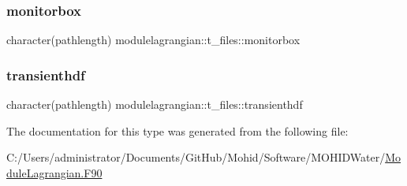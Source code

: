 \subsubsection{\texorpdfstring{monitorbox}{monitorbox}}
{\footnotesize\ttfamily character(pathlength) modulelagrangian\+::t\+\_\+files\+::monitorbox\hspace{0.3cm}{\ttfamily [private]}}

\mbox{\label{structmodulelagrangian_1_1t__files_a6f50904a622eb5ed4a3e9155ba763d34}} 
\subsubsection{\texorpdfstring{transienthdf}{transienthdf}}
{\footnotesize\ttfamily character(pathlength) modulelagrangian\+::t\+\_\+files\+::transienthdf\hspace{0.3cm}{\ttfamily [private]}}



The documentation for this type was generated from the following file\+:\begin{DoxyCompactItemize}
\item 
C\+:/\+Users/administrator/\+Documents/\+Git\+Hub/\+Mohid/\+Software/\+M\+O\+H\+I\+D\+Water/\mbox{\hyperlink{_module_lagrangian_8_f90}{Module\+Lagrangian.\+F90}}\end{DoxyCompactItemize}
